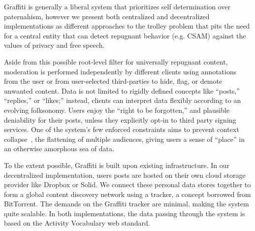 

Graffiti is generally a liberal system that prioritizes self determination over paternahism, however we present both centralized and decentralized implementations as different approaches to the trolley problem that pits the need for a central entity that can detect repugnant behavior (e.g. CSAM) against the values of privacy and free speech.

Aside from this possible root-level filter for universally repugnant content,
moderation is performed independently by different clients using annotations from the user or from user-selected third-parties to hide, flag, or demote unwanted content.
Data is not limited to rigidly defined concepts like ``posts,'' ``replies,'' or ``likes;'' instead, clients can interpret data flexibly according to an evolving folksonomy.
Users enjoy the ``right to be forgotten,'' and plausible deniability for their posts, unless they explicitly opt-in to third party signing services.
One of the system's few enforced constraints aims to prevent context collapse~\cite{contextcollapse}, the flattening of multiple audiences, giving users a sense of ``place'' in an otherwise amorphous sea of data.

To the extent possible, Graffiti is built upon existing infrastructure.
In our decentralized implementation, users posts are hosted on their own cloud storage provider like Dropbox or Solid.  We connect these personal data stores together to form a global content discovery network using a tracker, a concept borrowed from BitTorrent.  The demands on the Graffiti tracker are minimal, making the system quite scalable.
In both implementations, the data passing through the system is based on the Activity Vocabulary web standard.


